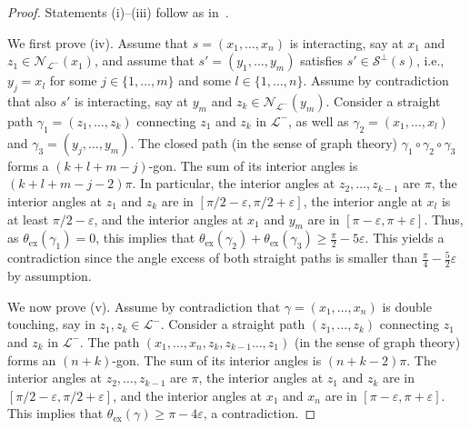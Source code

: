 \documentclass[reqno]{amsart}
\theoremstyle{plain}
\theoremstyle{definition}
\numberwithin{equation}{section}
\begin{document}
\begin{proof}  Statements {\rm (i)}--{\rm (iii)} follow as in~\cite[Proof of Lemma 3.6]{FriedrichKreutz}.   

We first prove {\rm (iv)}. Assume that $s=(x_1,\ldots,x_n) $ is
interacting, say at $x_1$ and  $z_1 \in 
\mathcal{N}_{\mathcal{L}^-}(x_1)$,   and assume that $s'=(y_1,\ldots,y_m)$ satisfies $s'\in \mathcal{S}^\perp(s)$, i.e., $y_j=x_l$ for some $j\in \{1,\ldots, m\}$ and some $l \in \{1,\ldots, n \}$. Assume by contradiction that also   $s'$ is interacting, say at  $y_m$ and  $z_k \in \mathcal{N}_{\mathcal{L}^-}(y_m)$.   Consider a straight path $\gamma_1 = (z_1,\ldots,z_k)$ connecting $z_1$ and $z_k$ in $\mathcal{L}^-$, as well as $\gamma_2 = ( x_1,\ldots, x_l)$ and $\gamma_3 = ( y_j,\ldots,y_m)$.  The closed path  (in the sense of graph theory)  $\gamma_1 \circ \gamma_2 \circ \gamma_3$ forms a $(k+l+m-j )$-gon. The sum of its interior angles is $(k+l+m-j - 2 )\pi$. In particular, the interior angles at $z_2,\ldots,z_{k-1}$ are $\pi$, the interior angles at $z_1$ and $z_k$ are in $[\pi/2-\varepsilon,\pi/2+\varepsilon]$, the interior angle at $x_l$ is at least $\pi/2-\varepsilon$, and the  interior angles at $x_1$ and $y_m$ are in $[\pi-\varepsilon,\pi+\varepsilon]$. Thus, as $\theta_{\mathrm{ex}}(\gamma_1) =0$, this implies that $\theta_{\mathrm{ex}}(\gamma_2) + \theta_{\mathrm{ex}}(\gamma_3)  \geq \frac{\pi}{2} - 5\varepsilon  $. This yields a contradiction since  the angle excess of both straight paths is smaller than $ \frac{\pi}{4} -\frac{5}{2}\varepsilon$ by assumption.  

We now prove {\rm (v)}. Assume by contradiction that $\gamma= (x_1,\ldots,x_n)$ is double touching, say in $z_1, z_k \in \mathcal{L}^-$. Consider a straight path $(z_1,\ldots,z_k)$ connecting $z_1$ and $z_k$ in $\mathcal{L}^-$. The path $(x_1,\ldots,x_n,z_k,z_{k-1}\ldots,z_1)$  (in the sense of graph theory)  forms an $(n+k)$-gon. The sum of its interior angles is $(n+k-2)\pi$. The interior angles at $z_2,\ldots,z_{k-1}$ are $\pi$, the interior angles at $z_1$ and $z_k$ are in $[\pi/2-\varepsilon,\pi/2+\varepsilon]$, and the  interior angles at $x_1$ and $x_n$ are in $[\pi-\varepsilon,\pi+\varepsilon]$. This implies that $\theta_{\mathrm{ex}}(\gamma) \geq \pi-4\varepsilon$, a contradiction.


\end{proof}
\end{document}
